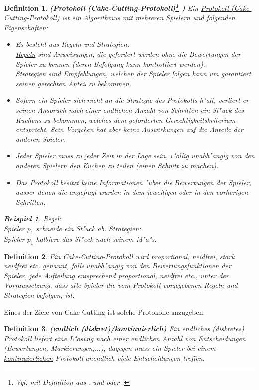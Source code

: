 \documentclass[11pt, a4paper, twoside]{article}
\newcommand{\markup}[1]{\uline{#1}}
\let\abk\nomenclature
\newtheorem*{defi}{Definition}
\newtheorem*{bsp}{Beispiel}
\numberwithin{equation}{section}
\begin{document}
\begin{defi}{\textbf{(Protokoll (Cake-Cutting-Protokoll)\footnote{Vgl. mit Definition aus \cite{3}, \cite{35} und \cite{24} oder \cite{34}\abk{CC}{\markup{C}ake-\markup{C}utting}.}
)}}
\newline Ein \underline{Protokoll (Cake-Cutting-Protokoll)} ist ein Algorithmus mit mehreren Spielern und folgenden Eigenschaften:
\begin{itemize}
\item{Es besteht aus Regeln und Strategien.\\ \underline{Regeln} sind Anweisungen, die gefordert werden ohne die Bewertungen der Spieler zu kennen (deren Befolgung kann kontrolliert werden).\\ \underline{Strategien} sind Empfehlungen, welchen der Spieler folgen kann um garantiert seinen gerechten Anteil zu bekommen.
}
\item{Sofern ein Spieler sich nicht an die Strategie des Protokolls h"alt, verliert er seinen Anspruch nach einer endlichen Anzahl von Schritten ein St"uck des Kuchens zu bekommen, welches dem geforderten Gerechtigkeitskriterium entspricht. Sein Vorgehen hat aber keine Auswirkungen auf die Anteile der anderen Spieler.}
\item Jeder Spieler muss zu jeder Zeit in der Lage sein, v"ollig unabh"angig von den anderen Spielern den Kuchen zu teilen (einen Schnitt zu machen).
\item Das Protokoll besitzt keine Informationen "uber die Bewertungen der Spieler, ausser denen die angefragt wurden in dem jeweiligen oder in den vorherigen Schritten.
\end{itemize}
\begin{bsp}
Regel:\\ Spieler $p_1$ schneide ein St"uck ab.
Strategien:\\ Spieler $p_1$ halbiere das St"uck nach seinem M"a"s.
\end{bsp}
\end{defi}
\begin{defi}
Ein Cake-Cutting-Protokoll wird proportional, neidfrei, stark neidfrei etc. genannt, falls unabh"angig von den Bewertungsfunktionen der Spieler, jede Aufteilung entsprechend proportional, neidfrei etc., unter der Vorraussetzung, dass alle Spieler die vom Protokoll vorgegebenen Regeln und Strategien befolgen, ist.
\end{defi}
Eines der Ziele von Cake-Cutting ist solche Protokolle anzugeben.\begin{defi}{\textbf{(endlich (diskret)/kontinuierlich)}}
\newline Ein \underline{endliches (diskretes)} Protokoll liefert eine L"osung nach einer endlichen Anzahl von Entscheidungen (Bewertungen, Markierungen,$\ldots$), dagegen muss ein Spieler bei einem \underline{kontinuierlichen} Protokoll unendlich viele Entscheidungen treffen.
\end{defi}
\end{document}
